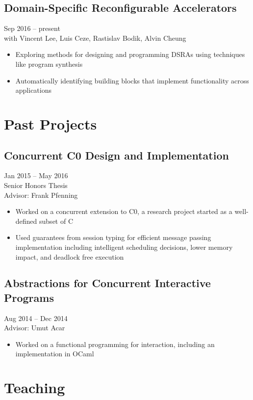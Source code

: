 \documentclass{article}
\begin{document}
\subsection{Domain-Specific Reconfigurable Accelerators}
\hfill Sep 2016 -- present\\
with Vincent Lee, Luis Ceze, Rastislav Bodik, Alvin Cheung
\begin{itemize}
\item Exploring methods for designing and programming DSRAs using techniques like program synthesis
\item Automatically identifying building blocks that implement functionality across applications
\end{itemize}

\section{Past Projects}

\subsection{Concurrent C0 Design and Implementation}
\hfill Jan 2015 -- May 2016 \\
Senior Honors Thesis \\
Advisor: Frank Pfenning
\begin{itemize}
\item Worked on a concurrent extension to C0, a research project started as a well-defined subset of C
\item Used guarantees from session typing for efficient message passing implementation including intelligent scheduling decisions, lower memory impact, and deadlock free execution
\end{itemize}

\subsection{Abstractions for Concurrent Interactive Programs}
\hfill Aug 2014 -- Dec 2014 \\
Advisor: Umut Acar
\begin{itemize}
\item Worked on a functional programming for interaction, including an implementation in OCaml
\end{itemize}


\section{Teaching}
\end{document}
